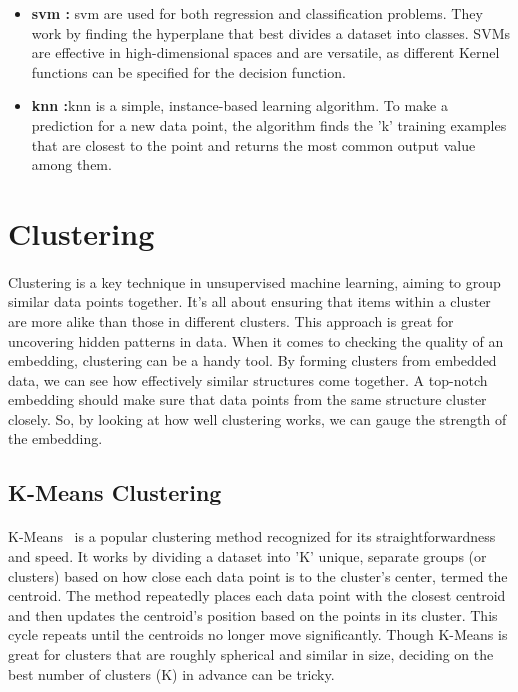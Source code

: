 \begin{itemize}
        \item \textbf{\acrfull{svm}\cite{wu_analysis_2006} : }\acrshort{svm} are used for both regression and classification problems. They work by finding the hyperplane that best divides a dataset into classes. SVMs are effective in high-dimensional spaces and are versatile, as different Kernel functions can be specified for the decision function.
        
        \item \textbf{\acrfull{knn}\cite{laaksonen_classification_1996} :}\acrshort{knn} is a simple, instance-based learning algorithm. To make a prediction for a new data point, the algorithm finds the 'k' training examples that are closest to the point and returns the most common output value among them.
    \end{itemize}
\section{Clustering}
    \paragraph{}Clustering is a key technique in unsupervised machine learning, aiming to group similar data points together. It's all about ensuring that items within a cluster are more alike than those in different clusters. This approach is great for uncovering hidden patterns in data. When it comes to checking the quality of an embedding, clustering can be a handy tool. By forming clusters from embedded data, we can see how effectively similar structures come together. A top-notch embedding should make sure that data points from the same structure cluster closely. So, by looking at how well clustering works, we can gauge the strength of the embedding.

    \subsection{K-Means Clustering}
        \paragraph*{}K-Means~\cite{macqueen_methods_1967} is a popular clustering method recognized for its straightforwardness and speed. It works by dividing a dataset into 'K' unique, separate groups (or clusters) based on how close each data point is to the cluster's center, termed the centroid. The method repeatedly places each data point with the closest centroid and then updates the centroid's position based on the points in its cluster. This cycle repeats until the centroids no longer move significantly. Though K-Means is great for clusters that are roughly spherical and similar in size, deciding on the best number of clusters (K) in advance can be tricky.

